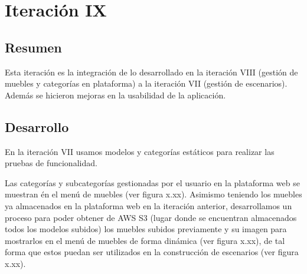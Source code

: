 \section{Iteración IX}
\subsection{Resumen}
Esta iteración es la integración de lo desarrollado en la iteración VIII (gestión de muebles y categorías en plataforma) a la iteración VII (gestión de escenarios). Además se hicieron mejoras en la usabilidad de la aplicación.

\subsection{Desarrollo}
En la iteración VII usamos modelos y categorías estáticos para realizar las pruebas de funcionalidad.\par
Las categorías y subcategorías gestionadas por el usuario en la plataforma web se muestran én el menú de muebles (ver figura x.xx). Asimismo teniendo los muebles ya almacenados en la plataforma web en la iteración anterior, desarrollamos un proceso para poder obtener de AWS S3 (lugar donde se encuentran almacenados todos los modelos subidos) los muebles subidos previamente y su imagen para mostrarlos en el menú de muebles de forma dinámica (ver figura x.xx), de tal forma que estos puedan ser utilizados en la construcción de escenarios (ver figura x.xx).


